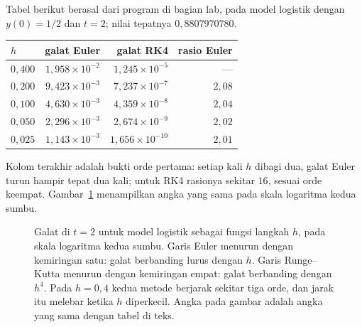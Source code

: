 Tabel berikut berasal dari program di bagian lab, pada model logistik dengan
$y(0)=1/2$ dan $t=2$; nilai tepatnya $0{,}8807970780$.

\begin{center}
{\small
\begin{tabular}{lrrr}
\hline
$h$ & galat Euler & galat RK4 & rasio Euler \\
\hline
$0{,}400$ & $1{,}958\times10^{-2}$ & $1{,}245\times10^{-5}$ & --- \\
$0{,}200$ & $9{,}423\times10^{-3}$ & $7{,}237\times10^{-7}$ & $2{,}08$ \\
$0{,}100$ & $4{,}630\times10^{-3}$ & $4{,}359\times10^{-8}$ & $2{,}04$ \\
$0{,}050$ & $2{,}296\times10^{-3}$ & $2{,}674\times10^{-9}$ & $2{,}02$ \\
$0{,}025$ & $1{,}143\times10^{-3}$ & $1{,}656\times10^{-10}$ & $2{,}01$ \\
\hline
\end{tabular}}
\end{center}

Kolom terakhir adalah bukti orde pertama: setiap kali $h$ dibagi dua, galat
Euler turun hampir tepat dua kali; untuk RK4 rasionya sekitar $16$, sesuai orde
keempat. Gambar~\ref{fig:galat-numerik} menampilkan angka yang sama pada skala
logaritma kedua sumbu.

\begin{figure}[htbp]
\centering
{}
\caption{Galat di $t=2$ untuk model logistik sebagai fungsi langkah $h$, pada
skala logaritma kedua sumbu. Garis Euler menurun dengan kemiringan satu: galat
berbanding lurus dengan $h$. Garis Runge--Kutta menurun dengan kemiringan empat:
galat berbanding dengan $h^{4}$. Pada $h=0{,}4$ kedua metode berjarak sekitar tiga
orde, dan jarak itu melebar ketika $h$ diperkecil. Angka pada gambar adalah
angka yang sama dengan tabel di teks.}
\label{fig:galat-numerik}
\end{figure}

